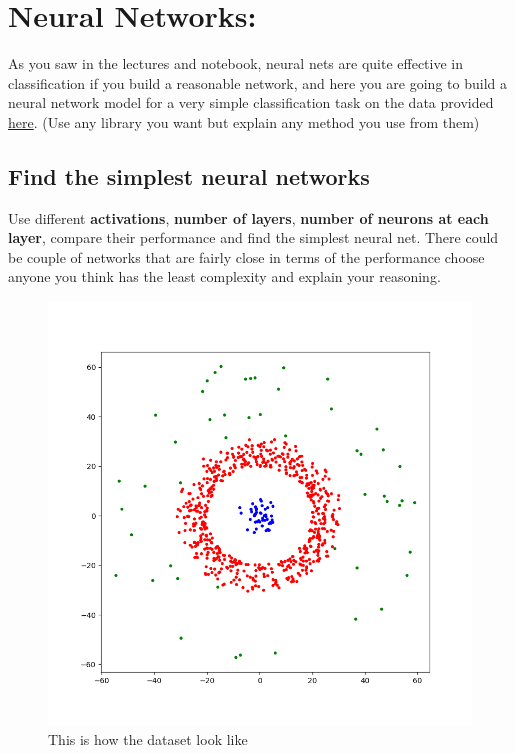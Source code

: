 \documentclass[12pt,letterpaper]{article}
\begin{document}
\section*{Neural Networks:}
As you saw in the lectures and notebook, neural nets are quite effective in classification if you build a reasonable network, and here you are going to build a neural network model for a very simple classification task on the data provided \href{https://abtinshahidi.github.io/files/train_set.txt}{here}. (Use any library you want but explain any method you use from them)

\subsection*{Find the simplest neural networks}
Use different \textbf{activations}, \textbf{number of layers}, \textbf{number of neurons at each layer}, compare their performance and find the simplest neural net. There could be couple of networks that are fairly close in terms of the performance choose anyone you think has the least complexity and explain your reasoning.



\begin{figure}[b!]
\centering
\includegraphics[scale=0.5]{data.png}
\caption{This is how the dataset look like}
\end{figure}
\end{document}
